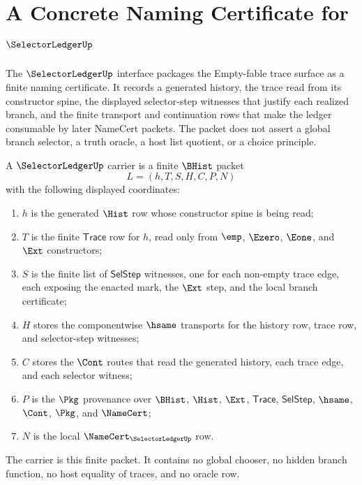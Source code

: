\chapter{A Concrete Naming Certificate for $\SelectorLedgerUp$}
\label{ch:concrete-instances-selectorledger-namecert}

The $\SelectorLedgerUp$ interface packages the Empty-fable trace surface as a finite naming certificate. It records a generated history, the trace read from its constructor spine, the displayed selector-step witnesses that justify each realized branch, and the finite transport and continuation rows that make the ledger consumable by later NameCert packets. The packet does not assert a global branch selector, a truth oracle, a host list quotient, or a choice principle.

\begin{definition}
\label{def:selector-ledger-carrier}
A $\SelectorLedgerUp$ carrier is a finite $\BHist$ packet
$$
L=(h,T,S,H,C,P,N)
$$
with the following displayed coordinates:
\begin{enumerate}
\item $h$ is the generated $\Hist$ row whose constructor spine is being read;
\item $T$ is the finite $\mathsf{Trace}$ row for $h$, read only from $\emp$, $\Ezero$, $\Eone$, and $\Ext$ constructors;
\item $S$ is the finite list of $\mathsf{SelStep}$ witnesses, one for each non-empty trace edge, each exposing the enacted mark, the $\Ext$ step, and the local branch certificate;
\item $H$ stores the componentwise $\hsame$ transports for the history row, trace row, and selector-step witnesses;
\item $C$ stores the $\Cont$ routes that read the generated history, each trace edge, and each selector witness;
\item $P$ is the $\Pkg$ provenance over $\BHist$, $\Hist$, $\Ext$, $\mathsf{Trace}$, $\mathsf{SelStep}$, $\hsame$, $\Cont$, $\Pkg$, and $\NameCert$;
\item $N$ is the local $\NameCert_{\SelectorLedgerUp}$ row.
\end{enumerate}
The carrier is this finite packet. It contains no global chooser, no hidden branch function, no host equality of traces, and no oracle row.
\end{definition}

